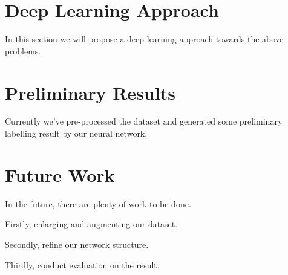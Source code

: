 \documentclass[10pt,twocolumn,letterpaper]{article}
\begin{document}
\section{Deep Learning Approach}
In this section we will propose a deep learning approach towards the above problems.

\section{Preliminary Results}
Currently we've pre-processed the dataset and generated some preliminary labelling result by our neural network.

\section{Future Work}
In the future, there are plenty of work to be done.

Firstly, enlarging and augmenting our dataset.

Secondly, refine our network structure.

Thirdly, conduct evaluation on the result.

{\small


}
\end{document}
